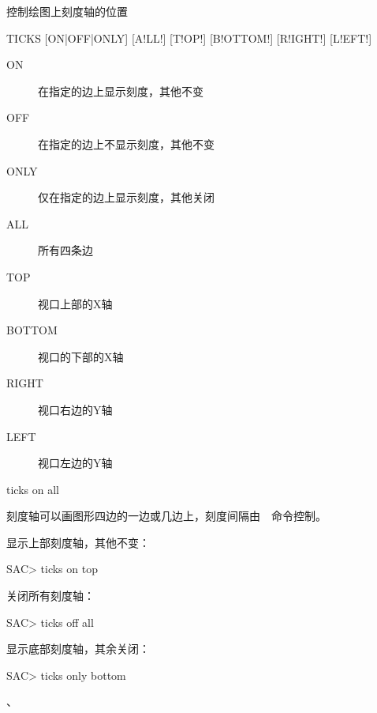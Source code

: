 \label{cmd:ticks}

控制绘图上刻度轴的位置

\begin{SACSTX}
TICKS [ON|OFF|ONLY] [A!LL!] [T!OP!] [B!OTTOM!] [R!IGHT!] [L!EFT!]
\end{SACSTX}

\begin{description}
\item [ON] 在指定的边上显示刻度，其他不变
\item [OFF] 在指定的边上不显示刻度，其他不变
\item [ONLY] 仅在指定的边上显示刻度，其他关闭
\item [ALL] 所有四条边
\item [TOP] 视口上部的X轴
\item [BOTTOM] 视口的下部的X轴
\item [RIGHT] 视口右边的Y轴
\item [LEFT] 视口左边的Y轴
\end{description}

\begin{SACDFT}
ticks on all
\end{SACDFT}

刻度轴可以画图形四边的一边或几边上，刻度间隔由~~命令控制。

显示上部刻度轴，其他不变：
\begin{SACCode}
SAC> ticks on top
\end{SACCode}

关闭所有刻度轴：
\begin{SACCode}
SAC> ticks off all
\end{SACCode}

显示底部刻度轴，其余关闭：
\begin{SACCode}
SAC> ticks only bottom
\end{SACCode}

、
